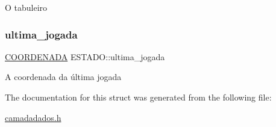 O tabuleiro \mbox{\label{structESTADO_a4896a5c5c1f40b43fb795623327e3f47}} 
\subsubsection{\texorpdfstring{ultima\+\_\+jogada}{ultima\_jogada}}
{\footnotesize\ttfamily \hyperlink{structCOORDENADA}{C\+O\+O\+R\+D\+E\+N\+A\+DA} E\+S\+T\+A\+D\+O\+::ultima\+\_\+jogada}

A coordenada da última jogada 

The documentation for this struct was generated from the following file\+:\begin{DoxyCompactItemize}
\item 
\hyperlink{camadadados_8h}{camadadados.\+h}\end{DoxyCompactItemize}
